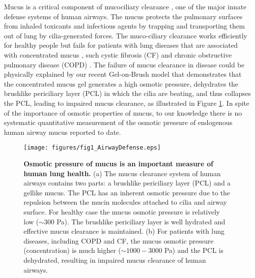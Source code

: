 \documentclass[8.5pt,twoside,twocolumn]{article}
\begin{document}


Mucus is a critical component of mucociliary clearance \cite{Wanner1996},
one of the major innate defense systems of human airways. The mucus protects
the pulmonary surfaces from inhaled toxicants and infectious agents by
trapping and transporting them out of lung by cilia-generated forces. The
muco-ciliary clearance works efficiently for healthy people but fails for
patients with lung diseases that are associated with concentrated mucus \cite%
{Matsui2006}, such cystic fibrosis (CF) and chronic obstructive pulmonary
disease (COPD) \cite{Boucher2007}. The failure of mucus clearance in disease
could be physically explained by our recent Gel-on-Brush model \cite%
{Button2012}that demonstrates that the concentrated mucus gel generates a
high osmotic pressure, dehydrates the brushlike periciliary layer (PCL) in
which the cilia are beating, and thus collapses the PCL, leading to impaired
mucus clearance, as illustrated in Figure \ref{fig:fig1_AirwayDefense}. In
spite of the importance of osmotic properties of mucus, to our knowledge
there is no systematic quantitative measurement of the osmotic pressure of
endogenous human airway mucus reported to date. 
\begin{figure}[h]
\centering
\texttt{[image: figures/fig1\_AirwayDefense.eps]}
\caption{\textbf{Osmotic pressure of mucus is an important measure of human
lung health.} (a) The mucus clearance system of human airways contains two
parts: a brushlike periciliary layer (PCL) and a gellike mucus. The PCL has
an inherent osmotic pressure due to the repulsion between the mucin
molecules attached to cilia and airway surface. For healthy case the mucus
osmotic pressure is relatively low ($\sim 300$ Pa). The brushlike
periciliary layer is well hydrated and effective mucus clearance is
maintained. (b) For patients with lung diseases, including COPD and CF, the
mucus osmotic pressure (concentration) is much higher ($\sim 1000-3000$ Pa)
and the PCL is dehydrated, resulting in impaired mucus clearance of human
airways.}
\label{fig:fig1_AirwayDefense}
\end{figure}
\end{document}
